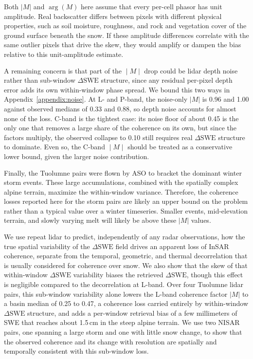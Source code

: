 \documentclass[tc, manuscript]{copernicus}
\begin{document}
Both $|M|$ and $\arg(M)$ here assume that every per-cell phasor has unit amplitude. Real backscatter differs between pixels with different physical properties, such as soil moisture, roughness, and rock and vegetation cover of the ground surface beneath the snow. If these amplitude differences correlate with the same outlier pixels that drive the skew, they would amplify or dampen the bias relative to this unit-amplitude estimate.

A remaining concern is that part of the $∣M∣$ drop could be lidar depth noise rather than sub-window $\Delta\mathrm{SWE}$ structure, since any residual per-pixel depth error adds its own within-window phase spread. We bound this two ways in Appendix~\ref{appendix:noise}. At L- and P-band, the noise-only $|M|$ is 0.96 and 1.00 against observed medians of 0.33 and 0.88, so depth noise accounts for almost none of the loss. C-band is the tightest case: its noise floor of about 0.45 is the only one that removes a large share of the coherence on its own, but since the factors multiply, the observed collapse to 0.10 still requires real $\Delta\mathrm{SWE}$ structure to dominate. Even so, the C-band $∣M∣$ should be treated as a conservative lower bound, given the larger noise contribution.

Finally, the Tuolumne pairs were flown by ASO to bracket the dominant winter storm events. These large accumulations, combined with the spatially complex alpine terrain, maximize the within-window variance. Therefore, the coherence losses reported here for the storm pairs are likely an upper bound on the problem rather than a typical value over a winter timeseries. Smaller events, mid-elevation terrain, and slowly varying melt will likely be above these $|M|$ values.

\conclusions  %
We use repeat lidar to predict, independently of any radar observations, how the true spatial variability of the $\Delta\mathrm{SWE}$ field drives an apparent loss of InSAR coherence, separate from the temporal, geometric, and thermal decorrelation that is usually considered for coherence over snow. We also show that the skew of that within-window $\Delta\mathrm{SWE}$ variability biases the retrieved $\Delta\mathrm{SWE}$, though this effect is negligible compared to the decorrelation at L-band. Over four Tuolumne lidar pairs, this sub-window variability alone lowers the L-band coherence factor $|M|$ to a basin median of 0.25 to 0.47, a coherence loss carried entirely by within-window $\Delta\mathrm{SWE}$ structure, and adds a per-window retrieval bias of a few millimeters of SWE that reaches about 1.5\,\unit{cm} in the steep alpine terrain. We use two NISAR pairs, one spanning a large storm and one with little snow change, to show that the observed coherence and its change with resolution are spatially and temporally consistent with this sub-window loss.
\end{document}

